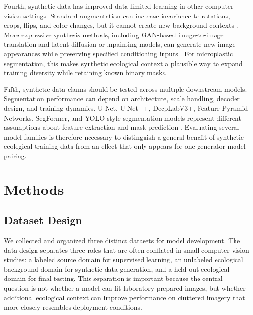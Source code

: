 \documentclass{article}
\begin{document}
Fourth, synthetic data has improved data-limited learning in other computer vision settings. Standard augmentation can increase invariance to rotations, crops, flips, and color changes, but it cannot create new background contexts \cite{shorten2019}. More expressive synthesis methods, including GAN-based image-to-image translation and latent diffusion or inpainting models, can generate new image appearances while preserving specified conditioning inputs \cite{isola2017,rombach2022,podell2023,lugmayr2022,suvorov2022,li2022mat}. For microplastic segmentation, this makes synthetic ecological context a plausible way to expand training diversity while retaining known binary masks.

Fifth, synthetic-data claims should be tested across multiple downstream models. Segmentation performance can depend on architecture, scale handling, decoder design, and training dynamics. U-Net, U-Net++, DeepLabV3+, Feature Pyramid Networks, SegFormer, and YOLO-style segmentation models represent different assumptions about feature extraction and mask prediction \cite{ronneberger2015,zhou2018,chen2018,lin2017,xie2021,yolo11}. Evaluating several model families is therefore necessary to distinguish a general benefit of synthetic ecological training data from an effect that only appears for one generator-model pairing.

\section{Methods}

\subsection{Dataset Design}

We collected and organized three distinct datasets for model development. The data design separates three roles that are often conflated in small computer-vision studies: a labeled source domain for supervised learning, an unlabeled ecological background domain for synthetic data generation, and a held-out ecological domain for final testing. This separation is important because the central question is not whether a model can fit laboratory-prepared images, but whether additional ecological context can improve performance on cluttered imagery that more closely resembles deployment conditions.
\end{document}
